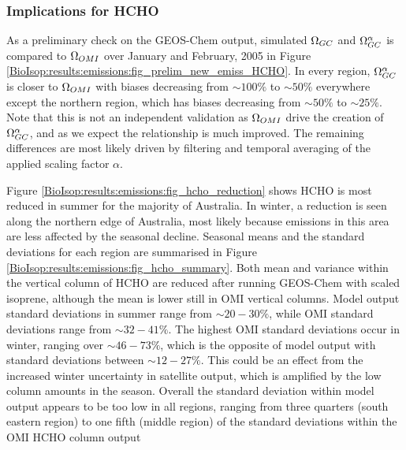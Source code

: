     
    \subsubsection{Implications for HCHO}
  
      As a preliminary check on the GEOS-Chem output, simulated $\Omega_{GC}$ and $\Omega_{GC}^{\alpha}$ is compared to $\Omega_{OMI}$ over January and February, 2005 in Figure \ref{BioIsop:results:emissions:fig_prelim_new_emiss_HCHO}.
      In every region, $\Omega_{GC}^{\alpha}$ is closer to $\Omega_{OMI}$ with biases decreasing from $\sim{100\%}$ to  $\sim{50\%}$ everywhere except the northern region, which has biases decreasing from $\sim{50\%}$ to $\sim{25\%}$.
      Note that this is not an independent validation as $\Omega_{OMI}$ drive the creation of $\Omega_{GC}^{\alpha}$, and as we expect the relationship is much improved.
      The remaining differences are most likely driven by filtering and temporal averaging of the applied scaling factor $\alpha$.
      
      
      
      Figure \ref{BioIsop:results:emissions:fig_hcho_reduction} shows HCHO is most reduced in summer for the majority of Australia.
      In winter, a reduction is seen along the northern edge of Australia, most likely because emissions in this area are less affected by the seasonal decline.
      Seasonal means and the standard deviations for each region are summarised in Figure \ref{BioIsop:results:emissions:fig_hcho_summary}.
      Both mean and variance within the vertical column of HCHO are reduced after running GEOS-Chem with scaled isoprene, although the mean is lower still in OMI vertical columns.
      Model output standard deviations in summer range from $\sim{20-30}\%$, while OMI standard deviations range from $\sim{32-41}\%$.
      The highest OMI standard deviations occur in winter, ranging over $\sim{46-73}\%$, which is the opposite of model output with standard deviations between $\sim{12-27}\%$.
      This could be an effect from the increased winter uncertainty in satellite output, which is amplified by the low column amounts in the season.
      Overall the standard deviation within model output appears to be too low in all regions, ranging from three quarters (south eastern region) to one fifth (middle region) of the standard deviations within the OMI HCHO column output
      
